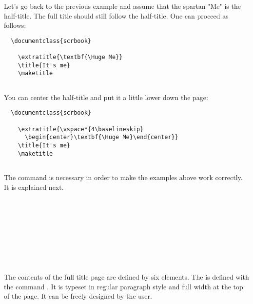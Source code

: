 \begin{Example}
  Let's go back to the previous example and assume
  that the spartan "Me" is the half-title. The full title should
  still follow the half-title. One can proceed as follows:
\begin{lstlisting}
  \documentclass{scrbook}
  
    \extratitle{\textbf{\Huge Me}}
    \title{It's me}
    \maketitle
  
\end{lstlisting}
  You can  center the half-title and put it a little lower down the page:
\begin{lstlisting}
  \documentclass{scrbook}
  
    \extratitle{\vspace*{4\baselineskip}
      \begin{center}\textbf{\Huge Me}\end{center}}
    \title{It's me}
    \maketitle
  
\end{lstlisting}
  The command  is necessary in order to make the examples
  above work correctly. It is explained next.
\end{Example}
%


\begin{Declaration}
  \\
  \\
  \\
  \\
  \\
  \\
  \\
\end{Declaration}%
%
%
%
%
%
%
%
%
The contents of the full title page are defined by six elements. The
 is defined with the
command . It is typeset in regular paragraph style
and full width at the top of the page. It can be freely designed by
the user.

